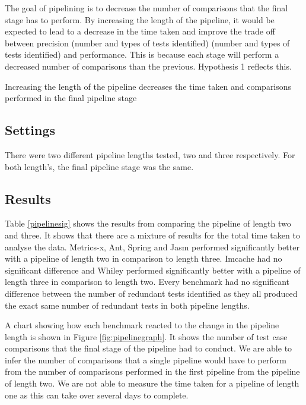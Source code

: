 The goal of pipelining is to decrease the number of comparisons that the final stage has to perform. By increasing the length of the pipeline, it would be expected to lead to a decrease in the time taken and improve the trade off between precision (number and types of tests identified)  (number and types of tests identified) and performance. This is because each stage will perform a decreased number of comparisons than the previous. Hypothesis 1 reflects this.

\begin{hyp}
Increasing the length of the pipeline decreases the time taken and comparisons performed in the final pipeline stage
\end{hyp}

\subsection{Settings}
There were two different pipeline lengths tested, two and three respectively. For both length's, the final pipeline stage was the same.

\subsection{Results}

Table \ref{pipelinesig} shows the results from comparing the pipeline of length two and three. It shows that there are a mixture of results for the total time taken to analyse the data. Metrics-x, Ant, Spring and Jasm performed significantly better with a pipeline of length two in comparison to length three. Imcache had no significant difference and Whiley performed significantly better with a pipeline of length three in comparison to length two. Every benchmark had no significant difference between the number of redundant tests identified as they all produced the exact same number of redundant tests in both pipeline lengths.

A chart showing how each benchmark reacted to the change in the pipeline length is shown in Figure \ref{fig:pipelinegraph}. It shows the number of test case comparisons that the final stage of the pipeline had to conduct. We are able to infer the number of comparisons that a single pipeline would have to perform from the number of comparisons performed in the first pipeline from the pipeline of length two. We are not able to measure the time taken for a pipeline of length one as this can take over several days to complete.

